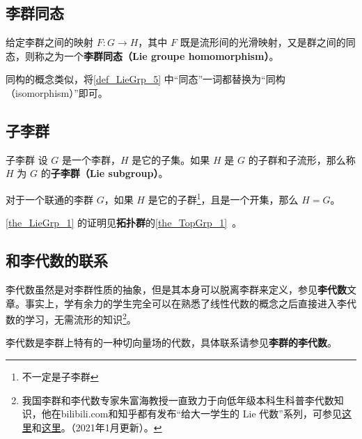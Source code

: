 \subsection{李群同态}

\begin{definition}{}\label{def_LieGrp_5}
给定李群之间的映射 $F:G\to H$，其中 $F$ 既是流形间的光滑映射，又是群之间的同态，则称之为一个\textbf{李群同态（Lie groupe homomorphism）}。
\end{definition}

同构的概念类似，将\autoref{def_LieGrp_5} 中“同态”一词都替换为“同构（isomorphism）”即可。

\subsection{子李群}

\begin{definition}{子李群}
设 $G$ 是一个李群，$H$ 是它的子集。如果 $H$ 是 $G$ 的子群和子流形，那么称 $H$ 为 $G$ 的\textbf{子李群（Lie subgroup）}。
\end{definition}

\begin{theorem}{}\label{the_LieGrp_1}
对于一个联通的李群 $G$，如果 $H$ 是它的子群\footnote{不一定是子李群}，且是一个开集，那么 $H=G$。
\end{theorem}

\autoref{the_LieGrp_1} 的证明见\textbf{拓扑群}的\autoref{the_TopGrp_1}~。


\subsection{和李代数的联系}

李代数虽然是对李群性质的抽象，但是其本身可以脱离李群来定义，参见\textbf{李代数}文章。事实上，学有余力的学生完全可以在熟悉了线性代数的概念之后直接进入李代数的学习，无需流形的知识\footnote{我国李群和李代数专家朱富海教授一直致力于向低年级本科生科普李代数知识，他在bilibili.com和知乎都有发布“给大一学生的 Lie 代数”系列，可参见\href{https://space.bilibili.com/509086270?from=search&seid=2394735306274350134}{这里}和\href{https://zhuanlan.zhihu.com/p/161735986}{这里}。（2021年1月更新）。}。

李代数是李群上特有的一种切向量场的代数，具体联系请参见\textbf{李群的李代数}。




